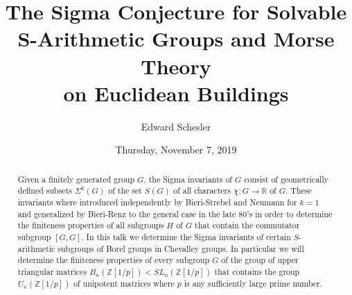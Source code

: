 \documentclass{UAmathtalk}
\author{Edward Schesler}
\title{The Sigma Conjecture for Solvable S-Arithmetic Groups and Morse Theory\\on Euclidean Buildings}
\date{Thursday, November 7, 2019}
\begin{document}
\maketitle

\begin{abstract}
Given a finitely generated group $G$, the Sigma invariants of $G$ consist of geometrically defined subsets $\Sigma^k(G)$ of the set $S(G)$ of all characters $\chi\colon G \to \mathbb{R}$ of $G$. These invariants where introduced independently by Bieri-Strebel and Neumann for $k=1$ and generalized by Bieri-Renz to the general case in the late 80's in order to determine the finiteness properties of all subgroups $H$ of $G$ that contain the commutator subgroup $[G,G]$. In this talk we determine the Sigma invariants of certain $S$-arithmetic subgroups of Borel groups in Chevalley groups. In particular we will determine the finiteness properties of
every subgroup $G$ of the group of upper triangular matrices $B_n(\mathbb{Z}[1/p]) < SL_n(\mathbb{Z}[1/p])$ that contains the group $U_n(\mathbb{Z}[1/p])$ of unipotent matrices where $p$ is any sufficiently large prime number.
\end{abstract}
\end{document}
